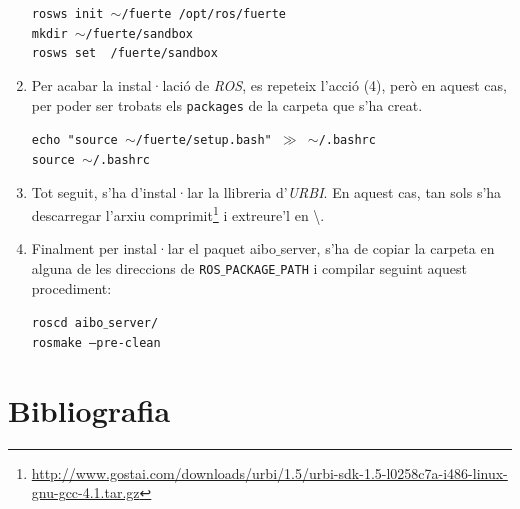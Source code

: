 \documentclass[12pt,a4paper,final,twoside]{report}
\begin{document}
\begin{enumerate}
\texttt{rosws init $\sim$/fuerte /opt/ros/fuerte}\\
\texttt{mkdir $\sim$/fuerte/sandbox}\\
\texttt{rosws set ~/fuerte/sandbox}

\item Per acabar la instal·lació de \textit{ROS}, es repeteix l'acció (4), però en aquest cas, per poder ser trobats els \texttt{packages} de la carpeta que s'ha creat.

\texttt{echo "source $\sim$/fuerte/setup.bash" $\gg$ $\sim$/.bashrc\\source $\sim$/.bashrc}

\item Tot seguit, s'ha d'instal·lar la llibreria d'\textit{URBI}. En aquest cas, tan sols s'ha descarregar l'arxiu comprimit\footnote{\url{http://www.gostai.com/downloads/urbi/1.5/urbi-sdk-1.5-l0258c7a-i486-linux-gnu-gcc-4.1.tar.gz}} i extreure'l en \textbackslash .


\item Finalment per instal·lar el paquet aibo$\_$server, s'ha de copiar la carpeta en alguna de les direccions de \texttt{ROS$\_$PACKAGE$\_$PATH} i compilar seguint aquest procediment:

\texttt{roscd aibo$\_$server/}\\
\texttt{rosmake --pre-clean}

\end{enumerate}

\chapter{Bibliografia}
\end{document}
